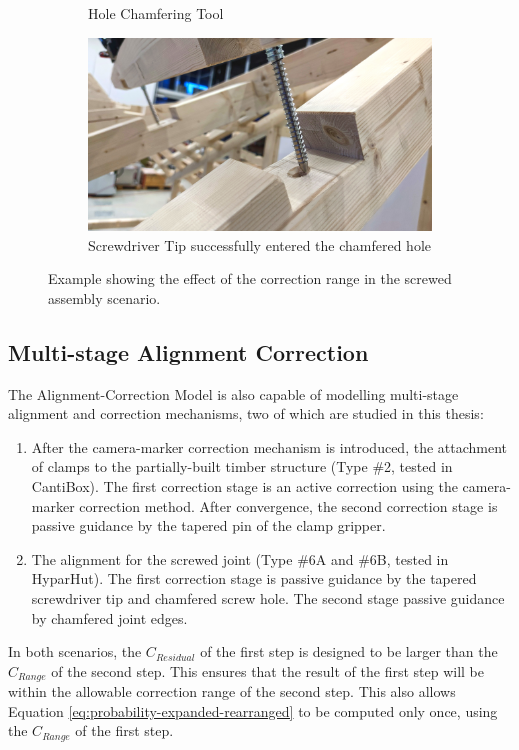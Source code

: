 \begin{figure}
\begin{subfigure}[b]{0.49\textwidth}
        \caption{Hole Chamfering Tool}
        \label{fig:chamfering_tool}
    \end{subfigure}
    \hfill
    \begin{subfigure}[b]{0.49\textwidth}
        \centering
        \includegraphics[width=\textwidth]{images/09/Correction Successful.jpg}
        \caption{Screwdriver Tip successfully entered the chamfered hole}
        \label{fig:screwdriver_tip_successful}
    \end{subfigure}
    \caption{Example showing the effect of the correction range in the screwed assembly scenario.}
    \label{fig:screwed-assembly-scenario}
\end{figure}

\FloatBarrier

\subsection{Multi-stage Alignment Correction}
\label{subsection:new-hypo-multi-stage-alignment-correction}

The Alignment-Correction Model is also capable of modelling multi-stage alignment and correction mechanisms, two of which are studied in this thesis:

\begin{enumerate}
	\item After the camera-marker correction mechanism is introduced, the attachment of clamps to the partially-built timber structure (Type \#2, tested in CantiBox). The first correction stage is an active correction using the camera-marker correction method. After convergence, the second correction stage is passive guidance by the tapered pin of the clamp gripper.

	\item The alignment for the screwed joint (Type \#6A and \#6B, tested in HyparHut). The first correction stage is passive guidance by the tapered screwdriver tip and chamfered screw hole. The second stage passive guidance by chamfered joint edges. 

\end{enumerate}
In both scenarios, the $C_{Residual}$ of the first step is designed to be larger than the $C_{Range}$ of the second step. This ensures that the result of the first step will be within the allowable correction range of the second step. This also allows Equation \ref{eq:probability-expanded-rearranged} to be computed only once, using the $C_{Range}$ of the first step.

